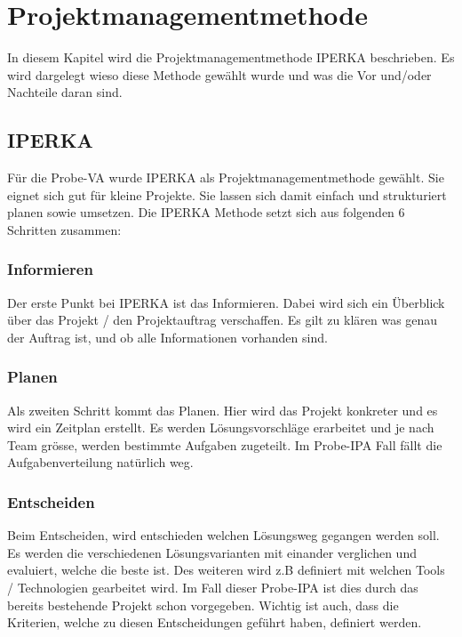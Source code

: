 
\chapter{Projektmanagementmethode}\label{ch:projektmanagementmethode}

In diesem Kapitel wird die Projektmanagementmethode IPERKA\cite{iperka} beschrieben. Es wird dargelegt wieso diese Methode gewählt wurde und was die Vor und/oder Nachteile daran sind.

\section{IPERKA}\label{sec:iperka}

Für die Probe-VA wurde IPERKA als Projektmanagementmethode gewählt. Sie eignet sich gut für kleine Projekte. Sie lassen sich damit einfach und strukturiert planen sowie umsetzen. 
Die IPERKA Methode setzt sich aus folgenden 6 Schritten zusammen:

\subsection{Informieren}
Der erste Punkt bei IPERKA ist das Informieren. Dabei wird sich ein Überblick über das Projekt / den Projektauftrag verschaffen. Es gilt zu klären was genau der Auftrag ist, und ob alle Informationen vorhanden sind.

\subsection{Planen}
Als zweiten Schritt kommt das Planen. Hier wird das Projekt konkreter und es wird ein Zeitplan erstellt. Es werden Lösungsvorschläge erarbeitet und je nach Team grösse, werden bestimmte Aufgaben zugeteilt. Im Probe-IPA Fall fällt die Aufgabenverteilung natürlich weg. 

\subsection{Entscheiden}
Beim Entscheiden, wird entschieden welchen Lösungsweg gegangen werden soll. Es werden die verschiedenen Lösungsvarianten mit einander verglichen und evaluiert, welche die beste ist. Des weiteren wird z.B definiert mit welchen Tools / Technologien gearbeitet wird. Im Fall dieser Probe-IPA ist dies durch das bereits bestehende Projekt schon vorgegeben. Wichtig ist auch, dass die Kriterien, welche zu diesen Entscheidungen geführt haben, definiert werden.

